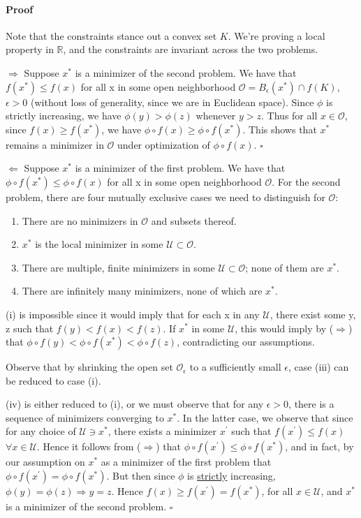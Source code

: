 \documentclass[letterpaper,12pt]{article}
\theoremstyle{definition}
\begin{document}
\paragraph{Proof} Note that the constraints stance out a convex set $K$. We're proving a local property in $\mathbb{R}$, and the constraints are invariant across the two problems.

$\Rightarrow$ Suppose $x^*$ is a minimizer of the second problem. We have that $f(x^*) \le f(x)$ for all x in some open neighborhood $\mathscr{O} = B_\epsilon(x^*) \cap f(K) $, $\epsilon > 0$ (without loss of generality, since we are in Euclidean space). Since $\phi$ is strictly increasing, we have $\phi(y) > \phi(z)$ whenever $y > z$. Thus for all $x \in \mathscr{O}$, since $f(x) \ge f(x^*)$, we have $\phi \circ f(x) \ge \phi \circ f(x^*)$.
This shows that $x^*$ remains a minimizer in $\mathscr{O}$ under optimization of $\phi \circ f(x)$. $\square$

$\Leftarrow$ Suppose $x^*$ is a minimizer of the first problem. We have that $\phi \circ f(x^*) \le \phi \circ f(x)$ for all x in some open neighborhood $\mathscr{O}$. For the second problem, there are four mutually exclusive cases we need to distinguish for $\mathscr{O}$:

\begin{enumerate}[label = (\roman*)]
\item There are no minimizers in $\mathscr{O}$ and subsets thereof.
\item $x^*$ is the local minimizer in some $\mathscr{U} \subset \mathscr{O}$.
\item There are multiple, finite minimizers in some $\mathscr{U} \subset \mathscr{O}$; none of them are $x^*$.
\item There are infinitely many minimizers, none of which are $x^*$.
\end{enumerate}

(i) is impossible since it would imply that for each x in any $ \mathscr{U}$, there exist some y, z such that $f(y) < f(x) < f(z)$. If $x^*$ in some $\mathscr{U}$, this would imply by ($\Rightarrow$) that $\phi \circ f(y) < \phi \circ f(x^*) < \phi \circ f(z)$, contradicting our assumptions.

Observe that by shrinking the open set $\mathscr{O}_\epsilon$ to a sufficiently small $\epsilon$, case (iii) can be reduced to case (i). 

(iv) is either reduced to (i), or we must observe that for any $\epsilon > 0$, there is a sequence of minimizers converging to $x^*$. In the latter case, we observe that since for any choice of $\mathscr{U} \ni x^*$, there exists a minimizer $x^{'}$ such that $f(x^{'}) \le f(x)$ $\forall x \in \mathscr{U}$. Hence it follows from ($\Rightarrow$) that $\phi \circ f(x^{'}) \le \phi \circ f(x^*)$, and in fact, by our assumption on $x^*$ as a minimizer of the first problem that $\phi \circ f(x^{'}) = \phi \circ f(x^*)$. But then since $\phi$ is \underline{strictly} increasing, $\phi(y) = \phi(z) \Rightarrow y = z$. Hence $f(x) \ge f(x^{'}) = f(x^*)$, for all $x \in \mathscr{U}$, and $x^*$ is a minimizer of the second problem.
$\square$


\vspace{25mm}


\end{document}
